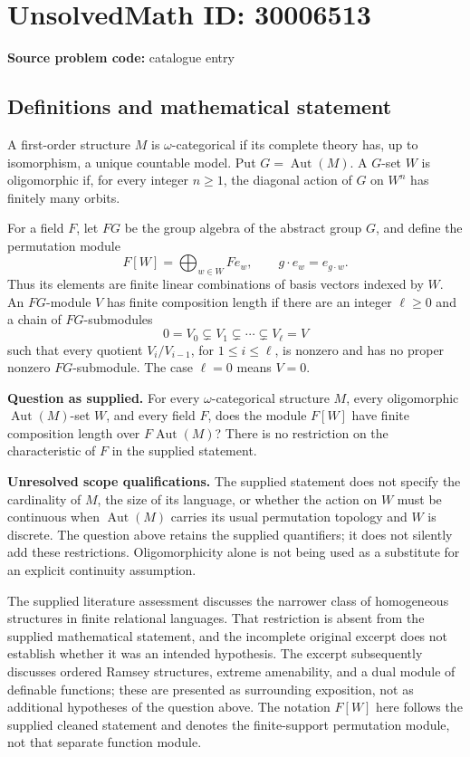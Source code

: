 \documentclass[11pt]{article}
\begin{document}
\section*{UnsolvedMath ID: 30006513}
\textbf{Source problem code:} catalogue entry
\subsection{Definitions and mathematical statement}
A first-order structure \(M\) is \(\omega\)-categorical if its complete theory has, up to isomorphism, a unique countable model. Put \(G=\operatorname{Aut}(M)\). A \(G\)-set \(W\) is oligomorphic if, for every integer \(n\geq 1\), the diagonal action of \(G\) on \(W^n\) has finitely many orbits.

For a field \(F\), let \(FG\) be the group algebra of the abstract group \(G\), and define the permutation module
\[
F[W]=\bigoplus_{w\in W}F e_w,\qquad g\cdot e_w=e_{g\cdot w}.
\]
Thus its elements are finite linear combinations of basis vectors indexed by \(W\). An \(FG\)-module \(V\) has finite composition length if there are an integer \(\ell\geq 0\) and a chain of \(FG\)-submodules
\[
0=V_0\subsetneq V_1\subsetneq\cdots\subsetneq V_\ell=V
\]
such that every quotient \(V_i/V_{i-1}\), for \(1\leq i\leq\ell\), is nonzero and has no proper nonzero \(FG\)-submodule. The case \(\ell=0\) means \(V=0\).

\textbf{Question as supplied.} For every \(\omega\)-categorical structure \(M\), every oligomorphic \(\operatorname{Aut}(M)\)-set \(W\), and every field \(F\), does the module \(F[W]\) have finite composition length over \(F\operatorname{Aut}(M)\)? There is no restriction on the characteristic of \(F\) in the supplied statement.

\textbf{Unresolved scope qualifications.} The supplied statement does not specify the cardinality of \(M\), the size of its language, or whether the action on \(W\) must be continuous when \(\operatorname{Aut}(M)\) carries its usual permutation topology and \(W\) is discrete. The question above retains the supplied quantifiers; it does not silently add these restrictions. Oligomorphicity alone is not being used as a substitute for an explicit continuity assumption.

The supplied literature assessment discusses the narrower class of homogeneous structures in finite relational languages. That restriction is absent from the supplied mathematical statement, and the incomplete original excerpt does not establish whether it was an intended hypothesis. The excerpt subsequently discusses ordered Ramsey structures, extreme amenability, and a dual module of definable functions; these are presented as surrounding exposition, not as additional hypotheses of the question above. The notation \(F[W]\) here follows the supplied cleaned statement and denotes the finite-support permutation module, not that separate function module.
\end{document}
